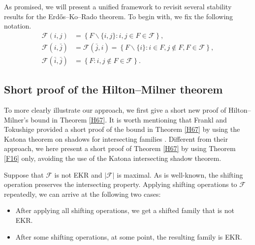 \documentclass[11pt]{article}
\numberwithin{equation}{section}
\begin{document}
\label{sec-3}

As promised, we will present a unified framework to 
revisit several stability results for the Erd\H{o}s--Ko--Rado theorem.  
To begin with, we fix the following notation. 
\begin{align*}
\mathcal{F}(i,j)&=\left\{F\backslash \{i,j\}: i, j\in F \in \mathcal{F}\right\},\\
\mathcal{F}(i,\bar{j})&=\mathcal{F}(\bar{j},i)=\left\{F\backslash \{i\}: i \in F, j\notin F, F \in \mathcal{F}\right\},\\ \mathcal{F}(\bar{i},\bar{j})&=\left\{F: i, j\notin F \in \mathcal{F}\right\}.
\end{align*}



\subsection{Short proof of the Hilton--Milner theorem}

To more clearly illustrate our approach, 
we first give a short new proof of Hilton--Milner's bound in Theorem \ref{H67}. 
It is worth mentioning that Frankl and Tokushige \cite{FT92} provided a short proof of the bound in Theorem \ref{H67} by using the Katona theorem on shadows for intersecting families \cite{K64}. Different from their approach, 
we here present a short proof of Theorem \ref{H67} by using Theorem \ref{F16} only,  avoiding the use of the Katona intersecting shadow theorem. 

\vspace{3mm}
Suppose that  $\mathcal{F}$ is not EKR and $|\mathcal{F}|$ is maximal. As is well-known, the shifting operation preserves the intersecting property. 
Applying shifting operations to $\mathcal{F}$ repeatedly, 
we can arrive at the following two cases: 
\begin{itemize} 
\item[(A)]
After applying all shifting operations, 
we get a shifted family that is not EKR. 

\item[(B)] 
After some shifting operations, 
 at some point, the resulting family is EKR. 
 \end{itemize}
\end{document}
